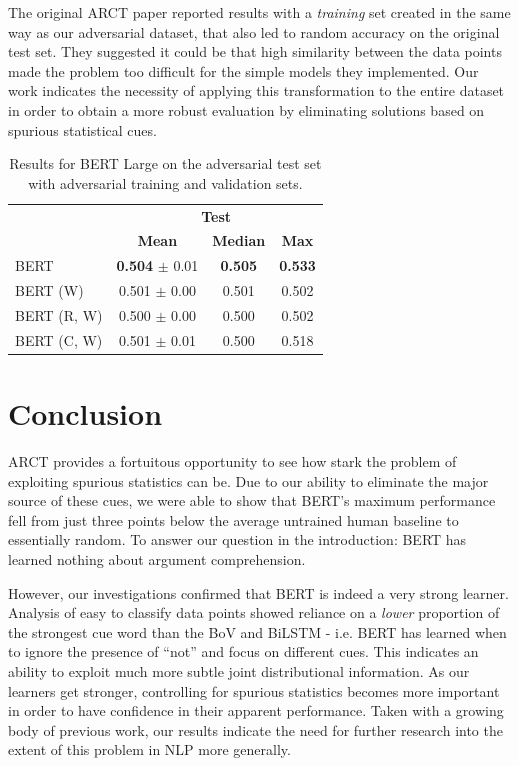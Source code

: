 \documentclass[11pt,a4paper]{article}
\begin{document}
The original ARCT paper \cite{HabernalWGS17} reported results with a \textit{training} set created in the same way as our adversarial dataset, that also led to random accuracy on the original test set. They suggested it could be that high similarity between the data points made the problem too difficult for the simple models they implemented. Our work indicates the necessity of applying this transformation to the entire dataset in order to obtain a more robust evaluation by eliminating solutions based on spurious statistical cues.

\begin{table}[t]
\begin{center}
\small
\begin{tabular}{|l|ccc|}
\hline
\multirow{2}{*}{} & \multicolumn{3}{c|}{\textbf{Test}} \\
& \textbf{Mean} & \textbf{Median} & \textbf{Max} \\
\hline
BERT & \textbf{0.504} $\pm$ 0.01 & \textbf{0.505} & \textbf{0.533} \\
BERT (W) & 0.501 $\pm$ 0.00 & 0.501 & 0.502 \\
BERT (R, W) & 0.500 $\pm$ 0.00 & 0.500 & 0.502 \\
BERT (C, W) & 0.501 $\pm$ 0.01 & 0.500 & 0.518 \\
\hline
\end{tabular}
\end{center}
\caption{Results for BERT Large on the adversarial test set with adversarial training and validation sets.}
\end{table}

\section{Conclusion}

ARCT provides a fortuitous opportunity to see how stark the problem of exploiting spurious statistics can be. Due to our ability to eliminate the major source of these cues, we were able to show that BERT's maximum performance fell from just three points below the average untrained human baseline to essentially random. To answer our question in the introduction: BERT has learned nothing about argument comprehension. 

However, our investigations confirmed that BERT is indeed a very strong learner. Analysis of easy to classify data points showed reliance on a \textit{lower} proportion of the strongest cue word than the BoV and BiLSTM - i.e. BERT has learned when to ignore the presence of ``not'' and focus on different cues. This indicates an ability to exploit much more subtle joint distributional information. As our learners get stronger, controlling for spurious statistics becomes more important in order to have confidence in their apparent performance. Taken with a growing body of previous work, our results indicate the need for further research into the extent of this problem in NLP more generally.
\end{document}
